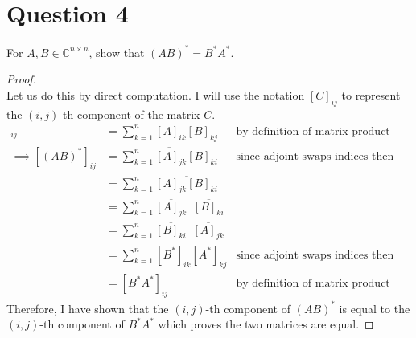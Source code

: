 \documentclass[10pt,a4paper]{article}
\theoremstyle{definition}
\theoremstyle{definition}
\numberwithin{equation}{section}
\begin{document}
\section*{Question 4}
For $A, B \in \mathbb{C}^{n \times n}$, show that $(AB)^* = B^* A^*$.

\begin{proof}$ $
\\Let us do this by direct computation. I will use the notation $[C]_{ij}$ to represent the $(i,j)$-th component of the matrix $C$. 
\begin{align*}
[AB]_{ij} &= \sum_{k = 1}^n [A]_{ik} [B]_{kj} &\text{by definition of matrix product}\\
\implies [(AB)^*]_{ij} &= \overline{ \sum_{k = 1}^n [A]_{jk} [B]_{ki} } &\text{since adjoint swaps indices then conjugates}\\
&= \sum_{k = 1}^n \overline{[A]_{jk} [B]_{ki}}\\
&= \sum_{k = 1}^n \overline{[A]_{jk}} \; \; \overline{ [B]_{ki}}\\
&= \sum_{k = 1}^n \overline{[B]_{ki}} \; \; \overline{[A]_{jk} }\\
&= \sum_{k = 1}^n [B^*]_{ik} [A^*]_{kj} &\text{since adjoint swaps indices then conjugates}\\
&= [B^* A^*]_{ij} &\text{by definition of matrix product}
\end{align*}
Therefore, I have shown that the $(i,j)$-th component of $(AB)^*$ is equal to the $(i,j)$-th component of $B^* A^*$ which proves the two matrices are equal. 
\end{proof}
\end{document}
